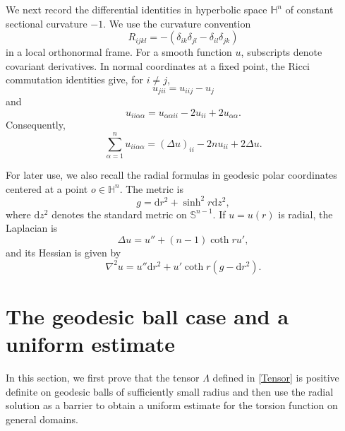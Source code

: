 \documentclass[11pt]{amsart}
\newcommand{\dd}{\mathrm{d}}
\numberwithin{theorem}{section}
\numberwithin{equation}{section}
\begin{document}
We next record the differential identities in hyperbolic space $\mathbb{H}^n$ of constant sectional curvature $-1$. We use the curvature convention $$R_{ijkl}=-(\delta_{ik}\delta_{jl}-\delta_{il}\delta_{jk})$$ in a local orthonormal frame. For a smooth function $u$, subscripts denote covariant derivatives. In normal coordinates at a fixed point, the Ricci commutation identities give, for $i\neq j$,
\begin{equation}\label{Formula-commutation formula-3rd}
u_{jii}=u_{iij}-u_j
\end{equation}
and $$u_{ii\alpha\alpha}=u_{\alpha\alpha ii}-2u_{ii}+2u_{\alpha\alpha}.$$
Consequently,
\begin{equation}\label{Formula-commutation formula-4th}
\sum_{\alpha=1}^nu_{ii\alpha\alpha}=(\Delta u)_{ii}-2nu_{ii}+2\Delta u.
\end{equation}

For later use, we also recall the radial formulas in geodesic polar coordinates centered at a point $o\in\mathbb{H}^n$. The metric is $$g=\dd r^2+\sinh^2r\dd z^2,$$where $\dd z^2$ denotes the standard metric on $\mathbb{S}^{n-1}$. If $u=u(r)$ is radial, the Laplacian is
\begin{equation}\label{Equation-radial Laplacian}
\Delta u=u''+(n-1)\coth r u',
\end{equation}
and its Hessian is given by
\begin{equation}\label{Equality-radial Hessian}
\nabla^2u=u''\dd r^2+u'\coth r(g-\dd r^2).
\end{equation}

\section{The geodesic ball case and a uniform estimate}\label{Section 3}

In this section, we first prove that the tensor $\Lambda$ defined in \eqref{Tensor} is positive definite on geodesic balls of sufficiently small radius and then use the radial solution as a barrier to obtain a uniform estimate for the torsion function on general domains.
\end{document}
